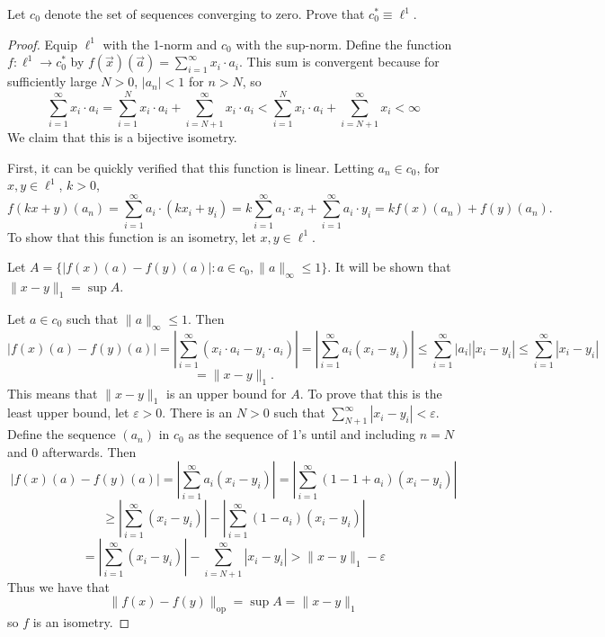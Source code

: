\documentclass{article}
\newcommand{\op}{\mathrm{op}}
\theoremstyle{plain} %
\numberwithin{thm}{section} %
\theoremstyle{definition}
\begin{document}
        Let $c_0$ denote the set of sequences converging to zero. Prove that $c_0^*\equiv \ell^1$.
        \begin{proof}
            Equip \(\ell ^1\) with the 1-norm and \(c_0\) with the sup-norm. Define the function \(f: \ell ^1 \to c_0^*\) by \(f(\vec{x})(\vec{a}) = \sum_{i=1}^{\infty} x_i \cdot a_i\). This sum is convergent because for sufficiently large \(N > 0\), \(|a_n| < 1\) for \(n > N\), so
            \[
                \sum_{i=1}^{\infty} x_i \cdot a_i = \sum_{i=1}^{N} x_i \cdot a_i + \sum_{i=N+1}^{\infty} x_i \cdot a_i < \sum_{i=1}^{N} x_i \cdot a_i + \sum_{i=N+1}^{\infty} x_i < \infty
            \]
            We claim that this is a bijective isometry.

            First, it can be quickly verified that this function is linear. Letting \(a_n \in c_0\), for \(x,y \in \ell ^1\), \(k > 0\),
            \[
                f(kx + y)(a_n) = \sum_{i=1}^{\infty} a_i \cdot (kx_i + y_i) = k \sum_{i=1}^{\infty} a_i \cdot x_i + \sum_{i=1}^{\infty} a_i \cdot y_i = kf(x)(a_n) + f(y)(a_n) \text{.} 
            \]
            To show that this function is an isometry, let \(x,y \in \ell ^1\).
            
            Let \(A = \{|f(x)(a) - f(y)(a)| : a \in c_0, \|a\| _{\infty} \leq 1\}\). It will be shown that \(\|x-y\| _1 = \sup A\).
            
            Let \(a \in c_0\) such that \(\|a\| _{\infty} \leq 1\). Then
            \[
                |f(x)(a)-f(y)(a)| = \left\vert \sum_{i=1}^{\infty} (x_i \cdot a_i - y_i \cdot a_i) \right\vert = \left\vert \sum_{i=1}^{\infty} a_i (x_i - y_i) \right\vert \leq \sum_{i=1}^{\infty} |a_i| |x_i - y_i| \leq \sum_{i=1}^{\infty} |x_i - y_i| 
            \]
            \[
                = \|x-y\| _1 \text{.} 
            \]
            This means that \(\|x-y\| _1\) is an upper bound for \(A\). To prove that this is the least upper bound, let \(\varepsilon > 0\). There is an \(N > 0\) such that \(\sum_{N+1}^{\infty} |x_i - y_i| < \varepsilon\). Define the sequence \((a_n)\) in \(c_0\) as the sequence of 1's until and including \(n=N\) and 0 afterwards. Then
            \[
                |f(x)(a) - f(y)(a)| = \left\vert \sum_{i=1}^{\infty} a_i (x_i - y_i) \right\vert = \left\vert \sum_{i=1}^{\infty} \left(1 - 1 + a_i \right)  (x_i - y_i) \right\vert
            \]
            \[
                \geq \left\vert \sum_{i=1}^{\infty} (x_i - y_i) \right\vert - \left\vert \sum_{i=1}^{\infty} \left( 1 - a_i \right)  (x_i - y_i) \right\vert
            \]
            \[
                =  \left\vert \sum_{i=1}^{\infty} (x_i - y_i) \right\vert - \sum_{i=N+1}^{\infty} |x_i - y_i| > \|x-y\| _1 - \varepsilon
            \]
            Thus we have that 
            \[
                \|f(x) - f(y)\| _{\op} = \sup {A} = \|x-y\| _1
            \]
            so \(f\) is an isometry.


\end{proof}
\end{document}
